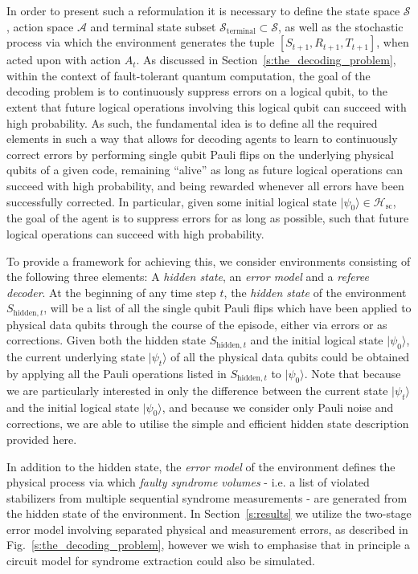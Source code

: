 \documentclass[twocolumn,preprintnumbers,amsmath,amssymb,notitlepage,nofootinbib,longbibliography,superscriptaddress,aps,pra,10pt]{revtex4-1}
\begin{document}
	In order to present such a reformulation it is necessary to define the state space $\mathcal{S}$, action space $\mathcal{A}$ and terminal state subset $\mathcal{S}_\mathrm{terminal} \subset \mathcal{S}$, as well as the stochastic process via which the environment generates the tuple $[S_{t+1},R_{t+1},T_{t+1}]$,  when acted upon with action $A_t$.
	As discussed in Section~\ref{s:the_decoding_problem}, within the context of fault-tolerant quantum computation, the goal of the decoding problem is to continuously suppress errors on a logical qubit, to the extent that future logical operations involving this logical qubit can succeed with high probability.
	As such, the fundamental idea is to define all the required elements in such a way that allows for decoding agents to learn to continuously correct errors by performing single qubit Pauli flips on the underlying physical qubits of a given code, remaining ``alive'' as long as future logical operations can succeed with high probability, and being rewarded whenever all errors have been successfully corrected.
	In particular, given some initial logical state $|\psi_0\rangle \in \mathcal{H}_{\mathrm{sc}}$, the goal of the agent is to suppress errors for as long as possible, such that future logical operations can succeed with high probability.

	To provide a framework for achieving this, we consider environments consisting of the following three elements: A \emph{hidden state}, an \emph{error model} and a \emph{referee decoder}.
	At the beginning of any time step $t$, the \emph{hidden state} of the environment $S_{\mathrm{hidden},t}$, will be a list of all the single qubit Pauli flips which have been applied to physical data qubits through the course of the episode, either via errors or as corrections.
	Given both the hidden state $S_{\mathrm{hidden},t}$ and the initial logical state $|\psi_0\rangle$, the current underlying state $|\psi_t\rangle$ of all the physical data qubits could be obtained by applying all the Pauli operations listed in $S_{\mathrm{hidden},t}$ to $|\psi_0\rangle$.
	Note that because we are particularly interested in only the difference between the current state $|\psi_t\rangle$ and the initial logical state $|\psi_0\rangle$, and because we consider only Pauli noise and corrections, we are able to utilise the simple and efficient hidden state description provided here.

	In addition to the hidden state, the \emph{error model} of the environment defines the physical process via which \emph{faulty syndrome volumes} - i.e. a list of violated stabilizers from multiple sequential syndrome measurements - are generated from the hidden state of the environment.
	In Section~\ref{s:results} we utilize the two-stage error model involving separated physical and measurement errors, as described in Fig.~\ref{s:the_decoding_problem}, however we wish to emphasise that in principle a circuit model for syndrome extraction could also be simulated.
\end{document}
